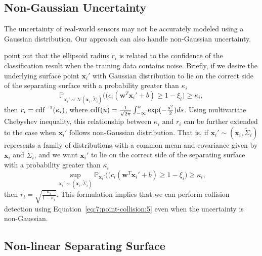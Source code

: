\subsection{Non-Gaussian Uncertainty}
\label{sec:7:algorithm:2}
The uncertainty of real-world sensors may not be accurately modeled using a Gaussian distribution. Our approach can also handle non-Gaussian uncertainty.

\cite{Shivaswamy:2006:SOC} point out that the ellipsoid radius $r_i$ is related to the confidence of the classification result when the training data contains noise. Briefly, if we desire the underlying surface point $\mathbf x_i'$ with Gaussian distribution to lie on the correct side of the separating surface with a probability greater than $\kappa_i$
\begin{equation}
\mathbb{P}_{\mathbf x_i'\sim \mathcal{N}(\mathbf x_i, \widetilde{\Sigma}_i)}\Big((c_i(\mathbf w^T \mathbf x_i' + b) \geq 1 - \xi_i\Big) \geq \kappa_i,
\end{equation}
then $r_i = \erf^{-1}(\kappa_i)$, where $\erf(u) = \frac{1}{\sqrt{2\pi}}\int_{-\infty}^{u}\exp(-\frac{s^2}{2})ds$.
Using multivariate Chebyshev inequality, this relationship between $\kappa_i$ and $r_i$ can be further extended to the case when $\mathbf x_i'$ follows non-Gaussian distribution. That is, if $\mathbf x_i' \sim (\mathbf x_i, \widetilde{\Sigma}_i)$ represents a family of distributions with a common mean and covariance given by $\mathbf x_i$ and $\widetilde{\Sigma}_i$, and we want $\mathbf x_i'$ to lie on the correct side of the separating surface with a probability greater than $\kappa_i$
\begin{equation}
\sup_{\mathbf x_i' \sim (\mathbf x_i, \widetilde{\Sigma}_i)} \mathbb{P}_{\mathbf x_i'}\Big((c_i(\mathbf w^T \mathbf x_i' + b) \geq 1 - \xi_i\Big) \geq \kappa_i,
\end{equation}
then $r_i = \sqrt{\frac{\kappa_i}{1-\kappa_i}}$. This formulation implies that we can perform collision detection using Equation~\ref{eq:7:point-collision:5}
even when the uncertainty is non-Gaussian.


\subsection{Non-linear Separating Surface}
\label{sec:7:algorithm:3}

